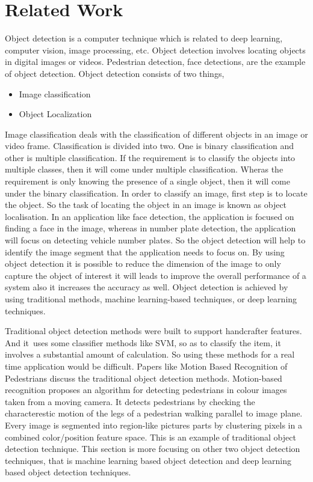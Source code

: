 \documentclass{svproc}
\begin{document}
\section{Related Work}
Object detection is a computer technique which is related to deep learning, computer vision, image processing, etc. Object detection involves locating objects in digital images or videos. Pedestrian detection, face detections, are the example of object detection. Object detection consists of two things,
\begin{itemize}
	\item Image classification
	\item Object Localization
\end{itemize}
Image classification deals with the classification of different objects in an image or video frame. Classification is divided into two. One is binary classification and other is multiple classification. If the requirement is to classify the objects into multiple classes, then it will come under multiple classification. Wheras the requirement is only knowing the presence of a single object, then it will come under the binary classification. In order to classify an image, first step is to locate the object. So the task of locating the object in an image is known as object localisation. In an application like face detection, the application is focused on finding a face in the image, whereas in number plate detection, the application will focus on detecting vehicle number plates. So the object detection will help to identify the image segment that the application needs to focus on. By using object detection it is possible to reduce the dimension of the image to only capture the object of interest it will leads to improve the overall performance of a system also it increases the accuracy as well. Object detection is achieved by using traditional methods, machine learning-based techniques, or deep learning techniques. 
\par 
Traditional object detection methods were built to support handcrafter features. And it uses some classifier methods like SVM, so as to classify the item, it involves a substantial amount of calculation. So using these methods for a real time application would be difficult. Papers like Motion Based Recognition of Pedestrians \cite{1} discuss the traditional object detection methods. Motion-based recognition proposes an algorithm for detecting pedestrians in colour images taken from a moving camera. It detects pedestrians by checking the characterestic motion of the legs of a pedestrian walking parallel to image plane. Every image is segmented into region-like pictures parts by clustering pixels in a combined color/position feature space. This is an example of traditional object detection technique. This section is more focusing on other two object detection techniques, that is machine learning based object detection and deep learning based object detection techniques. 
\end{document}
